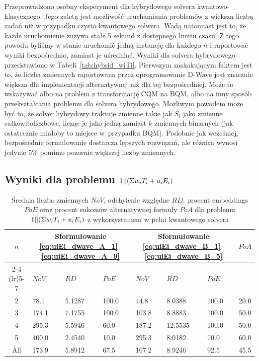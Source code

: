 Przeprowadzono osobny eksperyment dla hybrydowego solvera kwantowo-klasycznego. Jego zaletą jest możliwość uruchamiania problemów z większą liczbą zadań niż w przypadku czysto kwantowego solwera. Wadą natomiast jest to, że każde uruchomienie zużywa stałe 5 sekund z dostępnego limitu czasu. Z tego powodu byliśmy w stanie uruchomić jedną instancję dla każdego $n$ i raportować wyniki bezpośrednio, zamiast je uśredniać. Wyniki dla solvera hybrydowego przedstawiono w Tabeli~\ref{tab:hybrid_wiTi}. Pierwszym zaskakującym faktem jest to, że liczba zmiennych raportowana przez oprogramowanie D-Wave jest znacznie większa dla implementacji alternatywnej niż dla tej bezpośredniej. Może to wskazywać albo na problem z transformację CQM na BQM, albo na inny sposób przekształcania problemu dla solvera hybrydowego. Możliwym powodem może być to, że solver hybrydowy traktuje zmienne takie jak $S_i$ jako zmienne całkowitoliczbowe, licząc je jako jedną zamiast $k$ zmiennych binarnych (jak ostatecznie miałoby to miejsce w~przypadku BQM). Podobnie jak wcześniej, bezpośrednie formułowanie dostarcza lepszych rozwiązań, ale różnica wynosi jedynie 5\% pomimo pozornie większej liczby zmiennych. 

\subsection{Wyniki dla problemu $1||(\Sigma{}w_i T_i+u_i E_i)$}

\begin{table}[!ht]
\renewcommand{\arraystretch}{1.5}
\caption{Średnia liczba zmiennych $\mathit{NoV}$, odchylenie względne $\mathit{RD}$, procent embeddings $\mathit{PoE}$ oraz procent sukcesów alternatywnej formuły $\mathit{PoA}$ dla problemu $1||(\Sigma{}w_i T_i+u_i E_i)$ z wykorzystaniem w pełni kwantowego solvera }\label{tab:quantum_uiEi}
\begin{tabularx}{\columnwidth}{c*{6}{X}c}
\toprule
\multirow{2}{*}{$n$} & \multicolumn{3}{c}{\scriptsize Sformułowanie \eqref{eq:uiEi_dwave_A_1}--\eqref{eq:uiEi_dwave_A_9}} & \multicolumn{3}{c}{\scriptsize Sformułowanie \eqref{eq:uiEi_dwave_B_1}--\eqref{eq:uiEi_dwave_B_5}} & \multirow{2}{*}{$\mathit{PoA}$} \\ \cmidrule(r){2-4} \cmidrule(lr){5-7}
& $\mathit{NoV}$ & $\mathit{RD}$ & $\mathit{PoE}$ & $\mathit{NoV}$ & $\mathit{RD}$ & $\mathit{PoE}$ & \\ \midrule
2 & \phantom{0}78.1 & 5.1287 & 100.0 & \phantom{0}44.8 & \phantom{0}8.0388 & 100.0 & 20.0 \\
3 & 174.1 & 7.1755  & 100.0 & 103.8 & \phantom{0}8.8883 & 100.0 & 50.0 \\
4 & 295.3 & 5.5946 & \phantom{0}60.0 & 187.2 & 12.5535 & 100.0 & 50.0 \\
5 & 400.0 & 2.4540 & \phantom{0}10.0 & 295.3 & \phantom{0}8.0182 & \phantom{0}70.0 & 60.0 \\ \midrule
All & 173.9 & 5.8912 & \phantom{0}67.5 & 107.2 & \phantom{0}8.9246 & \phantom{0}92.5 & 45.5 \\
\bottomrule
\end{tabularx}
\renewcommand{\arraystretch}{1.0}
\end{table}



